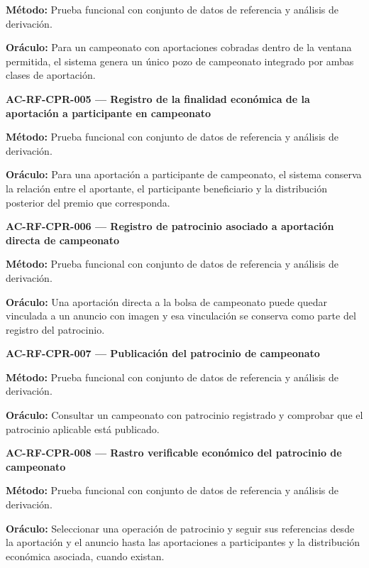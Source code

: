 \documentclass[10pt,letterpaper]{article}
\begin{document}
\textbf{Método:} Prueba funcional con conjunto de datos de referencia y análisis de derivación.\par
\textbf{Oráculo:} Para un campeonato con aportaciones cobradas dentro de la ventana permitida, el sistema genera un único pozo de campeonato integrado por ambas clases de aportación.\par\vspace{0.45em}
\noindent\textbf{AC-RF-CPR-005 --- Registro de la finalidad económica de la aportación a participante en campeonato}\par
\textbf{Método:} Prueba funcional con conjunto de datos de referencia y análisis de derivación.\par
\textbf{Oráculo:} Para una aportación a participante de campeonato, el sistema conserva la relación entre el aportante, el participante beneficiario y la distribución posterior del premio que corresponda.\par\vspace{0.45em}
\noindent\textbf{AC-RF-CPR-006 --- Registro de patrocinio asociado a aportación directa de campeonato}\par
\textbf{Método:} Prueba funcional con conjunto de datos de referencia y análisis de derivación.\par
\textbf{Oráculo:} Una aportación directa a la bolsa de campeonato puede quedar vinculada a un anuncio con imagen y esa vinculación se conserva como parte del registro del patrocinio.\par\vspace{0.45em}
\noindent\textbf{AC-RF-CPR-007 --- Publicación del patrocinio de campeonato}\par
\textbf{Método:} Prueba funcional con conjunto de datos de referencia y análisis de derivación.\par
\textbf{Oráculo:} Consultar un campeonato con patrocinio registrado y comprobar que el patrocinio aplicable está publicado.\par\vspace{0.45em}
\noindent\textbf{AC-RF-CPR-008 --- Rastro verificable económico del patrocinio de campeonato}\par
\textbf{Método:} Prueba funcional con conjunto de datos de referencia y análisis de derivación.\par
\textbf{Oráculo:} Seleccionar una operación de patrocinio y seguir sus referencias desde la aportación y el anuncio hasta las aportaciones a participantes y la distribución económica asociada, cuando existan.\par\vspace{0.45em}
\end{document}
